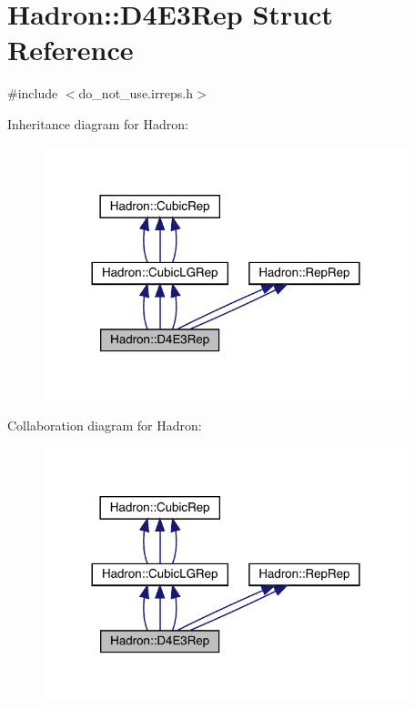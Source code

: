 \hypertarget{structHadron_1_1D4E3Rep}{}\section{Hadron\+:\+:D4\+E3\+Rep Struct Reference}
\label{structHadron_1_1D4E3Rep}


{\ttfamily \#include $<$do\+\_\+not\+\_\+use.\+irreps.\+h$>$}



Inheritance diagram for Hadron\+:
\nopagebreak
\begin{figure}[H]
\begin{center}
\leavevmode
\includegraphics[width=300pt]{d0/d73/structHadron_1_1D4E3Rep__inherit__graph}
\end{center}
\end{figure}


Collaboration diagram for Hadron\+:
\nopagebreak
\begin{figure}[H]
\begin{center}
\leavevmode
\includegraphics[width=300pt]{d3/d80/structHadron_1_1D4E3Rep__coll__graph}
\end{center}
\end{figure}
